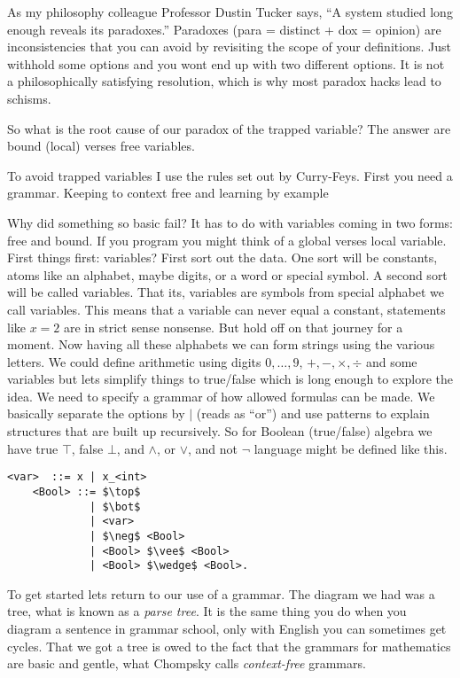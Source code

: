 As my philosophy  colleague Professor Dustin Tucker says, 
``A system studied long enough reveals its paradoxes.'' 
Paradoxes (para = distinct + dox = opinion) are inconsistencies that you can avoid by revisiting the scope 
of your definitions.  Just withhold some options and you wont end up with 
two different options.  It is not a philosophically satisfying resolution,
which is why most paradox hacks lead to schisms. 

So what is the root cause of our paradox of the trapped variable?
The answer are bound (local) verses free variables. 

To avoid trapped variables I use the rules set out by Curry-Feys.
First you need a grammar.  Keeping to context free and learning by example

Why did something so basic fail?  It has to do with variables coming in 
two forms: free and bound.  If you program you might think of a global 
verses local variable.  First things first: variables?
First sort out the data.  One sort will be constants, atoms like an alphabet,
maybe digits, or a word or special symbol. A second sort will be called variables.
That its, variables are symbols from special alphabet we call variables.
This means that a variable can never equal a constant, statements like $x=2$ 
are in strict sense nonsense.  But hold off on that journey for a moment.
Now having all these alphabets we can form strings using the various letters.
We could define arithmetic using digits $0,\ldots, 9$, $+,-,\times,\div$ and some 
variables but lets simplify things to true/false which is long enough to 
explore the idea.  We need to specify a grammar of how allowed formulas can 
be made.  We basically separate the options by $\mid$ (reads as ``or'')
and use patterns to explain structures that are built up recursively.
So for Boolean (true/false) algebra we have true $\top$, false $\bot$, 
and $\wedge$, or $\vee$, and not $\neg$ language might be defined like this.
\newpage    
\begin{lstfloat}
\begin{lstlisting}[mathescape]
    <var>  ::= x | x_<int>
    <Bool> ::= $\top$ 
             | $\bot$ 
             | <var>
             | $\neg$ <Bool> 
             | <Bool> $\vee$ <Bool> 
             | <Bool> $\wedge$ <Bool>.
\end{lstlisting}
\end{lstfloat}

To get started lets return to our use of a grammar.  The diagram we had 
was a tree, what is known as a \emph{parse tree}.  It is the same thing you 
do when you diagram a sentence in grammar school, only with English you can 
sometimes get cycles.  That we got a tree is owed to the fact that the grammars 
for mathematics are basic and gentle, what Chompsky calls \emph{context-free} grammars.


